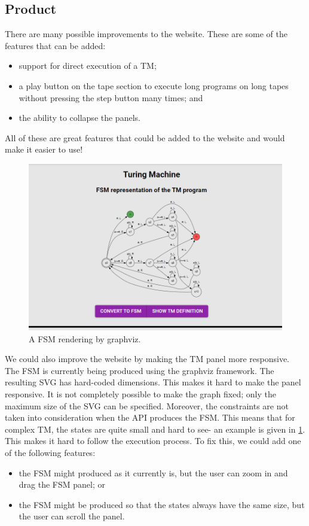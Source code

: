  \subsection{Product}
There are many possible improvements to the website. These are some of the features that can be added:
\begin{itemize}
    \item support for direct execution of a TM;
    \item a play button on the tape section to execute long programs on long tapes without pressing the step button many times; and
    \item the ability to collapse the panels.
\end{itemize}
All of these are great features that could be added to the website and would make it easier to use!

\begin{figure}[htb]
    \centering
    \includegraphics[scale=0.3]{images/Bad FSM visualisation.png}
    \caption{A FSM rendering by graphviz.}
    \label{fig:bad_graphviz_fsm}
\end{figure}

We could also improve the website by making the TM panel more responsive. The FSM is currently being produced using the graphviz framework. The resulting SVG has hard-coded dimensions. This makes it hard to make the panel responsive. It is not completely possible to make the graph fixed; only the maximum size of the SVG can be specified. Moreover, the constraints are not taken into consideration when the API produces the FSM. This means that for complex TM, the states are quite small and hard to see- an example is given in \ref{fig:bad_graphviz_fsm}. This makes it hard to follow the execution process. To fix this, we could add one of the following features:
\begin{itemize}
    \item the FSM might produced as it currently is, but the user can zoom in and drag the FSM panel; or
    \item the FSM might be produced so that the states always have the same size, but the user can scroll the panel. 
\end{itemize}

